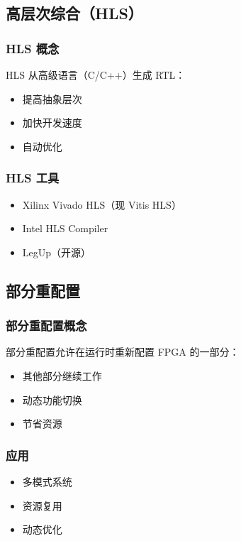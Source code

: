 \subsection{高层次综合（HLS）}

\subsubsection{HLS 概念}

HLS 从高级语言（C/C++）生成 RTL：
\begin{itemize}
  \item 提高抽象层次
  \item 加快开发速度
  \item 自动优化
\end{itemize}

\subsubsection{HLS 工具}

\begin{itemize}
  \item Xilinx Vivado HLS（现 Vitis HLS）
  \item Intel HLS Compiler
  \item LegUp（开源）
\end{itemize}

\subsection{部分重配置}

\subsubsection{部分重配置概念}

部分重配置允许在运行时重新配置 FPGA 的一部分：
\begin{itemize}
  \item 其他部分继续工作
  \item 动态功能切换
  \item 节省资源
\end{itemize}

\subsubsection{应用}

\begin{itemize}
  \item 多模式系统
  \item 资源复用
  \item 动态优化
\end{itemize}

